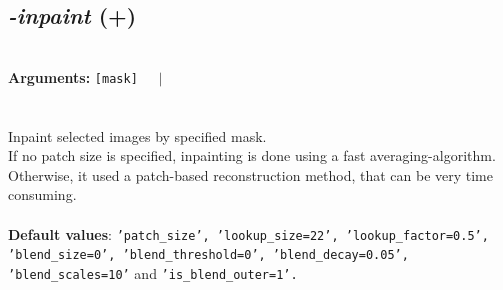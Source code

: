 \documentclass[a4paper,11pt,twoside]{book}
\begin{document}
\subsection{\emph{-inpaint} (+)}\vspace*{-0.5em}
~\\\textbf{Arguments: } 
{\small \texttt{[mask]}}~~~$|$\\
\\~\\
Inpaint selected images by specified mask.
~\\If no patch size is specified, inpainting is done using a fast averaging-algorithm.
~\\Otherwise, it used a patch-based reconstruction method, that can be very time consuming.
~\\~\\\textbf{Default values}: {\small \texttt{'patch\_size', 'lookup\_size=22', 'lookup\_factor=0.5', 'blend\_size=0', 'blend\_threshold=0', 'blend\_decay=0.05', 'blend\_scales=10'} and \texttt{'is\_blend\_outer=1'.}}
\end{document}
